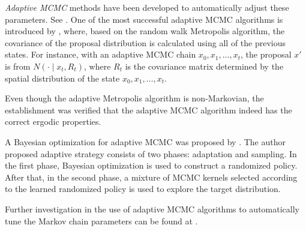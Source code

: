
\textit{Adaptive MCMC} methods have been developed to automatically adjust these parameters. See \eg \citep{andrieu2008tutorial, atchade2009adaptive, roberts2009examples}. One of the most successful adaptive MCMC algorithms is introduced by \cite{haario2001adaptive}, where, based on the  random walk Metropolis algorithm, the covariance of the proposal distribution is calculated using all of the previous states. For instance, with an adaptive MCMC chain $x_0,x_1,\ldots,x_t$, the proposal $x'$ is from $N(\cdot\mid x_t,R_t)$, where $R_t$ is the covariance matrix determined by the spatial distribution of the state $x_0,x_1,\ldots,x_t$. 

Even though the adaptive Metropolis algorithm is non-Markovian, the establishment was verified that the adaptive MCMC algorithm indeed has the correct ergodic properties. 

A Bayesian optimization for adaptive MCMC was proposed by \cite{mahendran2012adaptive}. The author proposed adaptive strategy consists of two phases: adaptation and sampling. In the first phase, Bayesian optimization is used to construct a randomized policy. After that, in the second phase,  a mixture of MCMC kernels selected according to the learned randomized policy is used to explore the target distribution. 

Further investigation in the use of adaptive MCMC algorithms to automatically
tune the Markov chain parameters can be found at \citep{roberts2009examples}. 


